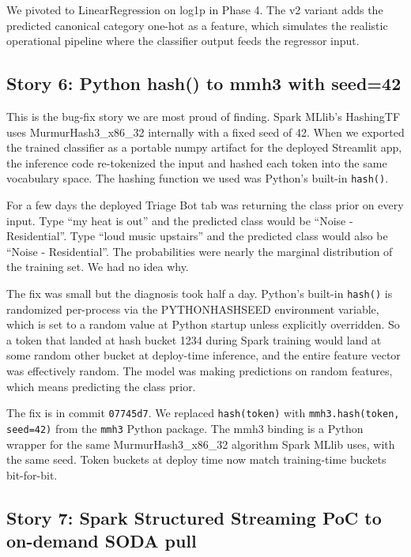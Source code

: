 \documentclass[11pt,letterpaper]{book}
\begin{document}
We pivoted to LinearRegression on log1p in Phase 4. The v2 variant adds the predicted canonical category one-hot as a feature, which simulates the realistic operational pipeline where the classifier output feeds the regressor input.

\subsection*{Story 6: Python hash() to mmh3 with seed=42}

This is the bug-fix story we are most proud of finding. Spark MLlib's HashingTF uses MurmurHash3\_x86\_32 internally with a fixed seed of 42. When we exported the trained classifier as a portable numpy artifact for the deployed Streamlit app, the inference code re-tokenized the input and hashed each token into the same vocabulary space. The hashing function we used was Python's built-in \texttt{hash()}.

For a few days the deployed Triage Bot tab was returning the class prior on every input. Type ``my heat is out'' and the predicted class would be ``Noise - Residential''. Type ``loud music upstairs'' and the predicted class would also be ``Noise - Residential''. The probabilities were nearly the marginal distribution of the training set. We had no idea why.

The fix was small but the diagnosis took half a day. Python's built-in \texttt{hash()} is randomized per-process via the PYTHONHASHSEED environment variable, which is set to a random value at Python startup unless explicitly overridden. So a token that landed at hash bucket 1234 during Spark training would land at some random other bucket at deploy-time inference, and the entire feature vector was effectively random. The model was making predictions on random features, which means predicting the class prior.

The fix is in commit \texttt{07745d7}. We replaced \texttt{hash(token)} with \texttt{mmh3.hash(token, seed=42)} from the \texttt{mmh3} Python package. The mmh3 binding is a Python wrapper for the same MurmurHash3\_x86\_32 algorithm Spark MLlib uses, with the same seed. Token buckets at deploy time now match training-time buckets bit-for-bit.

\subsection*{Story 7: Spark Structured Streaming PoC to on-demand SODA pull}
\end{document}
